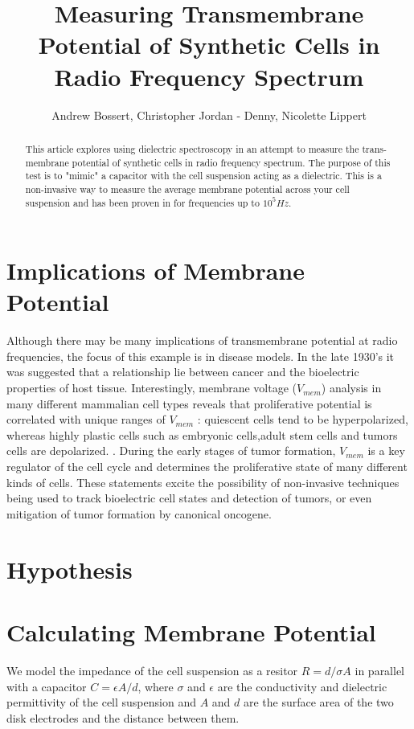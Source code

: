 \documentclass[journal]{IEEEtran}
\title{Measuring Transmembrane Potential of Synthetic Cells in Radio Frequency Spectrum}
\author{Andrew Bossert, Christopher Jordan - Denny, Nicolette Lippert}
\begin{document}
\maketitle

\begin{abstract}
This article explores using dielectric spectroscopy in an attempt to measure the trans-membrane potential of synthetic cells in radio frequency spectrum. The purpose of this test is to "mimic" a capacitor with the cell suspension acting as a dielectric. This is a non-invasive way to measure the average membrane potential across your cell suspension and has been proven in \cite{Dielectric Spectroscopy} for frequencies up to \textbf{$10^5 Hz$}.
\end{abstract}

\section{Implications of Membrane Potential}
Although there may be many implications of transmembrane potential at radio frequencies, the focus of this example is in disease models. In the late 1930's it was suggested that a relationship lie between cancer and the bioelectric properties of host tissue. Interestingly, membrane voltage ($V_{mem}$) analysis in many different mammalian cell types reveals that proliferative potential is correlated with unique ranges of $V_{mem}$ : quiescent cells tend to be hyperpolarized, whereas highly plastic cells such as embryonic cells,adult stem cells and tumors cells are depolarized. \cite{TMP-implications}. During the early stages of tumor formation, $V_{mem}$ is a key regulator of the cell cycle and determines the proliferative state of many different kinds of cells. These statements excite the possibility of non-invasive techniques being used to track bioelectric cell states and detection of tumors, or even mitigation of tumor formation by canonical oncogene.

\section{Hypothesis}


\section{Calculating Membrane Potential}
We model the impedance of the cell suspension as a resitor $R = d/\sigma A$ in parallel with a capacitor $C = \epsilon A/d$, where $\sigma$ and $\epsilon$ are the conductivity and dielectric permittivity of the cell suspension and $A$ and $d$ are the surface area of the two disk electrodes and the distance between them. 
\end{document}
